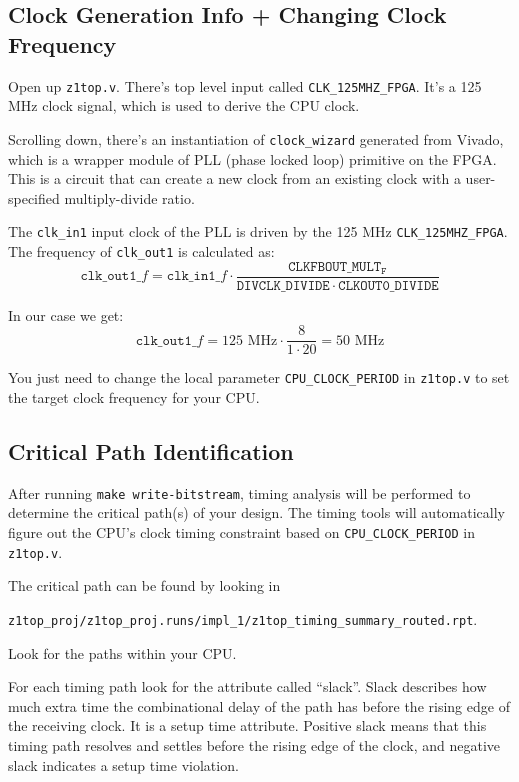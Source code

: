\documentclass[11pt]{article}
\begin{document}
\subsection{Clock Generation Info + Changing Clock Frequency}
Open up \verb|z1top.v|.
There's top level input called \verb|CLK_125MHZ_FPGA|.
It's a 125 MHz clock signal, which is used to derive the CPU clock.

Scrolling down, there's an instantiation of \verb|clock_wizard| generated from Vivado, which is a wrapper module of PLL (phase locked loop) primitive on the FPGA.
This is a circuit that can create a new clock from an existing clock with a user-specified multiply-divide ratio.

The \verb|clk_in1| input clock of the PLL is driven by the 125 MHz \verb|CLK_125MHZ_FPGA|.
The frequency of \verb|clk_out1| is calculated as:
\begin{equation*}
  \mathtt{clk\_out1}\_f = \mathtt{clk\_in1}\_f \cdot \frac{\mathtt{CLKFBOUT\_MULT_F}}{\mathtt{DIVCLK\_DIVIDE} \cdot \mathtt{CLKOUT0\_DIVIDE}}
\end{equation*}

In our case we get:
\begin{equation*}
  \mathtt{clk\_out1}\_f = 125 \text{ MHz} \cdot \frac{8}{1 \cdot 20} = 50 \text{ MHz}
\end{equation*}

You just need to change the local parameter \verb|CPU_CLOCK_PERIOD| in \verb|z1top.v| to set the target clock frequency for your CPU.

\subsection{Critical Path Identification}
After running \verb|make write-bitstream|, timing analysis will be performed to determine the critical path(s) of your design.
The timing tools will automatically figure out the CPU's clock timing constraint based on \verb|CPU_CLOCK_PERIOD| in \verb|z1top.v|.

The critical path can be found by looking in

\verb|z1top_proj/z1top_proj.runs/impl_1/z1top_timing_summary_routed.rpt|.

Look for the paths within your CPU.

For each timing path look for the attribute called ``slack''.
Slack describes how much extra time the combinational delay of the path has before the rising edge of the receiving clock.
It is a setup time attribute.
Positive slack means that this timing path resolves and settles before the rising edge of the clock, and negative slack indicates a setup time violation.
\end{document}
